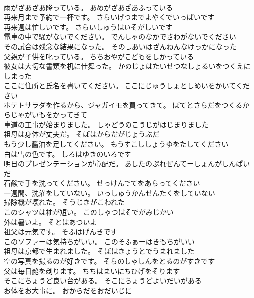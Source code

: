 \documentclass[8pt]{extreport}
\begin{document}
\begin{CJK}{UTF8}{min}
\\	雨がざあざあ降っている。	あめがざあざあふっている 
\\	再来月まで予約で一杯です。	さらいげつまでよやくでいっぱいです 
\\	再来週は忙しいです。	さらいしゅうはいそがしいです 
\\	電車の中で騒がないでください。	でんしゃのなかでさわがないでください 
\\	その試合は残念な結果になった。	そのしあいはざんねんなけっかになった 
\\	父親が子供を叱っている。	ちちおやがこどもをしかっている 
\\	彼女は大切な書類を机に仕舞った。	かのじょはたいせつなしょるいをつくえにしまった 
\\	ここに住所と氏名を書いてください。	ここにじゅうしょとしめいをかいてください 
\\	ポテトサラダを作るから、ジャガイモを買ってきて。	ぽてとさらだをつくるからじゃがいもをかってきて 
\\	車道の工事が始まりました。	しゃどうのこうじがはじまりました 
\\	祖母は身体が丈夫だ。	そぼはからだがじょうぶだ 
\\	もう少し醤油を足してください。	もうすこししょうゆをたしてください 
\\	白は雪の色です。	しろはゆきのいろです 
\\	明日のプレゼンテーションが心配だ。	あしたのぷれぜんてーしょんがしんぱいだ 
\\	石鹸で手を洗ってください。	せっけんでてをあらってください 
\\	一週間、洗濯をしていない。	いっしゅうかんせんたくをしていない 
\\	掃除機が壊れた。	そうじきがこわれた 
\\	このシャツは袖が短い。	このしゃつはそでがみじかい 
\\	外は暑いよ。	そとはあついよ 
\\	祖父は元気です。	そふはげんきです 
\\	このソファーは気持ちがいい。	このそふぁーはきもちがいい 
\\	祖母は京都で生まれました。	そぼはきょうとでうまれました 
\\	空の写真を撮るのが好きです。	そらのしゃしんをとるのがすきです 
\\	父は毎日髭を剃ります。	ちちはまいにちひげをそります 
\\	そこにちょうど良い台がある。	そこにちょうどよいだいがある 
\\	お体をお大事に。	おからだをおだいじに 

\end{CJK}
\end{document}

